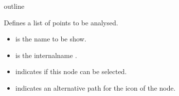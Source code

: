 \bigskip
\xmlstruct
{outline}
{
%
  Defines a list of points to be analysed.
\begin{itemize}
  \item {} is the name to be show.
   \item {} is the internalname .
\item {} indicates if this node can be
  selected.
\item {} indicates an alternative path for the icon
  of the node.

\end{itemize}
%
}
{}


